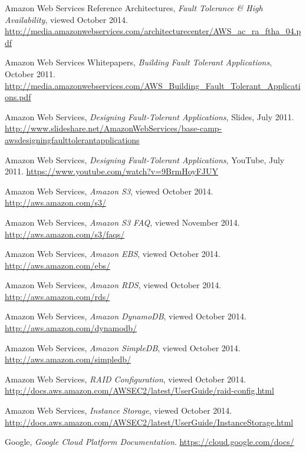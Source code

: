 \documentclass[11pt]{report}
\begin{document}
\begin{thebibliography}{99}

	Amazon Web Services Reference Architectures, \emph{Fault Tolerance \& High Availability}, viewed October 2014.
	\url{http://media.amazonwebservices.com/architecturecenter/AWS_ac_ra_ftha_04.pdf}
	
	Amazon Web Services Whitepapers, \emph{Building Fault Tolerant Applications}, October 2011.
	\url{http://media.amazonwebservices.com/AWS_Building_Fault_Tolerant_Applications.pdf}
	
	Amazon Web Services, \emph{Designing Fault-Tolerant Applications}, Slides, July 2011.
	\url{http://www.slideshare.net/AmazonWebServices/base-camp-awsdesigningfaulttolerantapplications}
	
	Amazon Web Services, \emph{Designing Fault-Tolerant Applications}, YouTube, July 2011.
	\url{https://www.youtube.com/watch?v=9BrmHoyFJUY}

	Amazon Web Services, \emph{Amazon S3}, viewed October 2014.
	\url{http://aws.amazon.com/s3/}
	
	Amazon Web Services, \emph{Amazon S3 FAQ}, viewed November 2014.
	\url{http://aws.amazon.com/s3/faqs/}
	
	Amazon Web Services, \emph{Amazon EBS}, viewed October 2014.
	\url{http://aws.amazon.com/ebs/}
	
	Amazon Web Services, \emph{Amazon RDS}, viewed October 2014.
	\url{http://aws.amazon.com/rds/}
	
	Amazon Web Services, \emph{Amazon DynamoDB}, viewed October 2014.
	\url{http://aws.amazon.com/dynamodb/}
	
	Amazon Web Services, \emph{Amazon SimpleDB}, viewed October 2014.
	\url{http://aws.amazon.com/simpledb/}	

	Amazon Web Services, \emph{RAID Configuration}, viewed October 2014.
	\url{http://docs.aws.amazon.com/AWSEC2/latest/UserGuide/raid-config.html}
	
	Amazon Web Services, \emph{Instance Storage}, viewed October 2014.
	\url{http://docs.aws.amazon.com/AWSEC2/latest/UserGuide/InstanceStorage.html}

	Google, \emph{Google Cloud Platform Documentation}.
	\url{https://cloud.google.com/docs/}	
	

\end{thebibliography}
\end{document}
